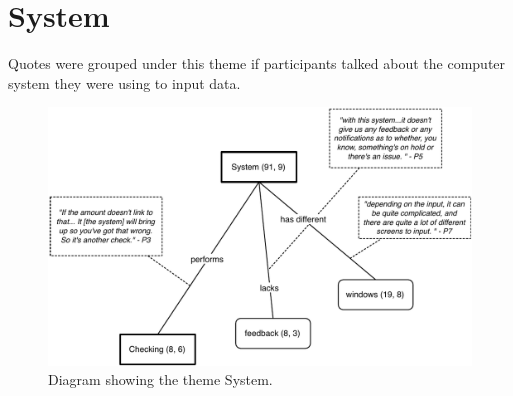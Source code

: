 \newpage

\section{System}
Quotes were grouped under this theme if participants talked about the computer system they were using to input data. 

\begin{figure}[!ht]
\centering
\includegraphics[width=\textwidth]{images/ch12/System.pdf}
\caption[Study 1 System diagram]{Diagram showing the theme System.}
\vspace{-9pt}
\label{fig:ch3_system}
\end{figure}

